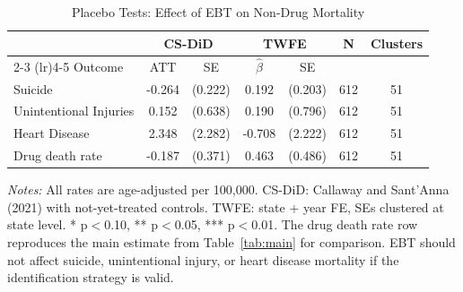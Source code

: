 \begin{table}[H]
\centering
\caption{Placebo Tests: Effect of EBT on Non-Drug Mortality}
\label{tab:placebo}
\small
\begin{threeparttable}
\begin{tabular}{lcccccc}
\toprule
& \multicolumn{2}{c}{CS-DiD} & \multicolumn{2}{c}{TWFE} & N & Clusters \\
\cmidrule(lr){2-3} \cmidrule(lr){4-5}
Outcome & ATT & SE & $\hat{\beta}$ & SE & & \\
\midrule
Suicide & -0.264 & (0.222) & 0.192 & (0.203) & 612 & 51 \\
Unintentional Injuries & 0.152 & (0.638) & 0.190 & (0.796) & 612 & 51 \\
Heart Disease & 2.348 & (2.282) & -0.708 & (2.222) & 612 & 51 \\
\midrule
Drug death rate & -0.187 & (0.371) & 0.463 & (0.486) & 612 & 51 \\
\bottomrule
\end{tabular}
\begin{tablenotes}[flushleft]
\footnotesize
\item \textit{Notes:} All rates are age-adjusted per 100,000. CS-DiD: Callaway and Sant'Anna (2021) with not-yet-treated controls. TWFE: state + year FE, SEs clustered at state level. * p$<$0.10, ** p$<$0.05, *** p$<$0.01. The drug death rate row reproduces the main estimate from Table~\ref{tab:main} for comparison. EBT should not affect suicide, unintentional injury, or heart disease mortality if the identification strategy is valid.
\end{tablenotes}
\end{threeparttable}
\end{table}
